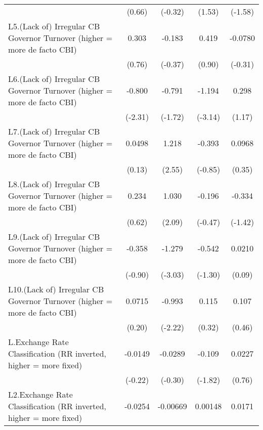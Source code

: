 {\begin{tabular}{l*{4}{c}}
                &   (0.66)         &  (-0.32)         &   (1.53)         &  (-1.58)         \\
[1em]
L5.(Lack of) Irregular CB Governor Turnover (higher = more de facto CBI)&    0.303         &   -0.183         &    0.419         &  -0.0780         \\
                &   (0.76)         &  (-0.37)         &   (0.90)         &  (-0.31)         \\
[1em]
L6.(Lack of) Irregular CB Governor Turnover (higher = more de facto CBI)&   -0.800\sym{*}  &   -0.791         &   -1.194\sym{**} &    0.298         \\
                &  (-2.31)         &  (-1.72)         &  (-3.14)         &   (1.17)         \\
[1em]
L7.(Lack of) Irregular CB Governor Turnover (higher = more de facto CBI)&   0.0498         &    1.218\sym{*}  &   -0.393         &   0.0968         \\
                &   (0.13)         &   (2.55)         &  (-0.85)         &   (0.35)         \\
[1em]
L8.(Lack of) Irregular CB Governor Turnover (higher = more de facto CBI)&    0.234         &    1.030\sym{*}  &   -0.196         &   -0.334         \\
                &   (0.62)         &   (2.09)         &  (-0.47)         &  (-1.42)         \\
[1em]
L9.(Lack of) Irregular CB Governor Turnover (higher = more de facto CBI)&   -0.358         &   -1.279\sym{**} &   -0.542         &   0.0210         \\
                &  (-0.90)         &  (-3.03)         &  (-1.30)         &   (0.09)         \\
[1em]
L10.(Lack of) Irregular CB Governor Turnover (higher = more de facto CBI)&   0.0715         &   -0.993\sym{*}  &    0.115         &    0.107         \\
                &   (0.20)         &  (-2.22)         &   (0.32)         &   (0.46)         \\
[1em]
L.Exchange Rate Classification (RR inverted, higher = more fixed)&  -0.0149         &  -0.0289         &   -0.109         &   0.0227         \\
                &  (-0.22)         &  (-0.30)         &  (-1.82)         &   (0.76)         \\
[1em]
L2.Exchange Rate Classification (RR inverted, higher = more fixed)&  -0.0254         & -0.00669         &  0.00148         &   0.0171         \\

\end{tabular}}
